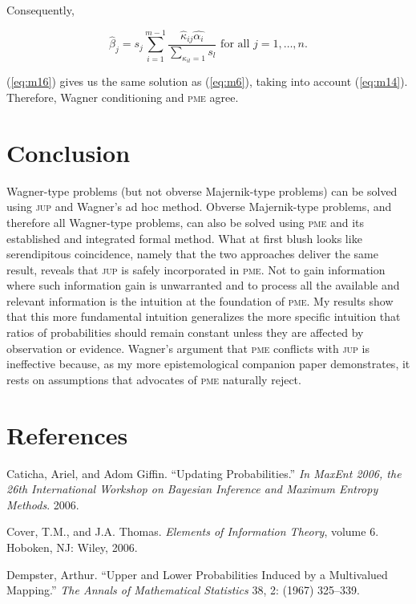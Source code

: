 \documentclass[entropy,article,submit,oneauthor,pdftex,12pt,a4paper]{mdpi}
\begin{document}
Consequently,

\begin{equation}
  \label{eq:m16}
  \hat{\beta}_{j}=s_{j}\sum_{i=1}^{m-1}\frac{\hat{\kappa}_{ij}\hat{\alpha_{i}}}{\sum_{\kappa_{il}=1}s_{l}}\mbox{ for all }j=1,\ldots,n.
\end{equation}

(\ref{eq:m16}) gives us the same solution as (\ref{eq:m6}), taking
into account (\ref{eq:m14}). Therefore, Wagner conditioning and
\textsc{pme} agree.

\section{Conclusion}
\label{Conclusion}

Wagner-type problems (but not obverse Majernik-type problems) can be
solved using \textsc{jup} and Wagner's ad hoc method. Obverse
Majernik-type problems, and therefore all Wagner-type problems, can
also be solved using \textsc{pme} and its established and integrated
formal method. What at first blush looks like serendipitous
coincidence, namely that the two approaches deliver the same result,
reveals that \textsc{jup} is safely incorporated in \textsc{pme}. Not
to gain information where such information gain is unwarranted and to
process all the available and relevant information is the intuition at
the foundation of \textsc{pme}. My results show that this more
fundamental intuition generalizes the more specific intuition that
ratios of probabilities should remain constant unless they are
affected by observation or evidence. Wagner's argument that
\textsc{pme} conflicts with \textsc{jup} is ineffective because, as my
more epistemological companion paper demonstrates, it rests on
assumptions that advocates of \textsc{pme} naturally reject.

\section{References}
\label{References}

Caticha, Ariel, and Adom Giffin. ``Updating Probabilities.'' \emph{In MaxEnt 2006, the 26th International Workshop on Bayesian Inference and Maximum Entropy Methods}. 2006.

Cover, T.M., and J.A. Thomas. \emph{Elements of Information Theory}, volume 6. Hoboken, NJ: Wiley, 2006.

Dempster, Arthur. ``Upper and Lower Probabilities Induced by a Multivalued Mapping.'' \emph{The Annals of Mathematical Statistics} 38, 2: (1967) 325--339.
\end{document}
